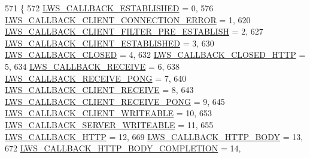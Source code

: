 \begin{DoxyCode}
571                           \{
572         \hyperlink{group__usercb_ggad62860e19975ba4c4af401c3cdb6abf7a24d39bf1cfc0bad9d92da9ac1717e439}{LWS\_CALLBACK\_ESTABLISHED}                                =  0,
576         \hyperlink{group__usercb_ggad62860e19975ba4c4af401c3cdb6abf7ad8c6207b0c4e732f3d507f0fb79370e8}{LWS\_CALLBACK\_CLIENT\_CONNECTION\_ERROR}                        =  
      1,
620         \hyperlink{group__usercb_ggad62860e19975ba4c4af401c3cdb6abf7aa536e574a642ff3ab9e12bff7ba2c6a2}{LWS\_CALLBACK\_CLIENT\_FILTER\_PRE\_ESTABLISH}                =  
      2,
627         \hyperlink{group__usercb_ggad62860e19975ba4c4af401c3cdb6abf7a7e12418eec9bce85735e6460176ab604}{LWS\_CALLBACK\_CLIENT\_ESTABLISHED}                          =  3,
630         \hyperlink{group__usercb_ggad62860e19975ba4c4af401c3cdb6abf7a48a9590e5e18c7920282e094a0bfd9d8}{LWS\_CALLBACK\_CLOSED}                                  =  4,
632         \hyperlink{group__usercb_ggad62860e19975ba4c4af401c3cdb6abf7a838b18d255c1b94a533287ba302a2eba}{LWS\_CALLBACK\_CLOSED\_HTTP}                                =  5,
634         \hyperlink{group__usercb_ggad62860e19975ba4c4af401c3cdb6abf7a492c1b1c0ac0ed980042ee732fe2990c}{LWS\_CALLBACK\_RECEIVE}                                        =  6,
638         \hyperlink{group__usercb_ggad62860e19975ba4c4af401c3cdb6abf7a2db02fc6e1c17ab62b52109d1aa9d738}{LWS\_CALLBACK\_RECEIVE\_PONG}                              =  7,
640         \hyperlink{group__usercb_ggad62860e19975ba4c4af401c3cdb6abf7abbbe7a0a67c5866ca9109d46823fc5b1}{LWS\_CALLBACK\_CLIENT\_RECEIVE}                          =  8,
643         \hyperlink{group__usercb_ggad62860e19975ba4c4af401c3cdb6abf7a136a7cec11c3afd13245623bd84e76c9}{LWS\_CALLBACK\_CLIENT\_RECEIVE\_PONG}                        =  9,
645         \hyperlink{group__usercb_ggad62860e19975ba4c4af401c3cdb6abf7a8e8b2e6dbeac76d8d126947d2166a514}{LWS\_CALLBACK\_CLIENT\_WRITEABLE}                              = 10,
653         \hyperlink{group__usercb_ggad62860e19975ba4c4af401c3cdb6abf7a7ec8e2e9557ee02a4fc9f7dec7e2babc}{LWS\_CALLBACK\_SERVER\_WRITEABLE}                              = 11,
655         \hyperlink{group__usercb_ggad62860e19975ba4c4af401c3cdb6abf7ae8d1de0bb56e03aa58cb4d44b18edd2e}{LWS\_CALLBACK\_HTTP}                                      = 12,
669         \hyperlink{group__usercb_ggad62860e19975ba4c4af401c3cdb6abf7ac4c68e00efcf1ff7bda7ada462aff8ae}{LWS\_CALLBACK\_HTTP\_BODY}                                    = 13,
672         \hyperlink{group__usercb_ggad62860e19975ba4c4af401c3cdb6abf7a2fce9a8608220f32abbf1422a5498804}{LWS\_CALLBACK\_HTTP\_BODY\_COMPLETION}                      = 14,

\end{DoxyCode}
